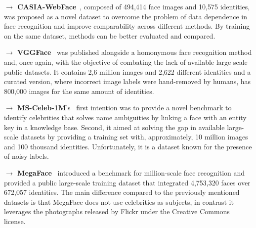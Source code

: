 \documentclass[class=report, crop=false, a4paper, 12pt]{standalone}
\begin{document}
\vspace{0.7\baselineskip}
\noindent\textbf{$\rightarrow$ CASIA-WebFace}~\autocite{yiLearningFaceRepresentation2014}, composed of 494,414 face images and 10,575 identities, was proposed as a novel dataset to overcome the problem of data dependence in face recognition and improve comparability across different methods. By training on the same dataset, methods can be better evaluated and compared.

\vspace{0.7\baselineskip}
\noindent\textbf{$\rightarrow$ VGGFace}~\autocite{parkhiDeepFaceRecognition2015} was published alongside a homonymous face recognition method and, once again, with the objective of combating the lack of available large scale public datasets. It contains 2,6 million images and 2,622 different identities and a curated version, where incorrect image labels were hand-removed by humans, has 800,000 images for the same amount of identities.




\vspace{0.7\baselineskip}
\noindent\textbf{$\rightarrow$ MS-Celeb-1M}'s~\autocite{guoMSCeleb1MDatasetBenchmark2016} first intention was to provide a novel benchmark to identify celebrities that solves name ambiguities by linking a face with an entity key in a knowledge base. Second, it aimed at solving the gap in available large-scale datasets by providing a training set with, approximately, 10 million images and 100 thousand identities. Unfortunately, it is a dataset known for the presence of noisy labels. 


\vspace{0.7\baselineskip}
\noindent\textbf{$\rightarrow$ MegaFace}~\autocite{nechLevelPlayingField2017} introduced a benchmark for million-scale face recognition and provided a public large-scale training dataset that integrated 4,753,320 faces over 672,057 identities. The main difference compared to the previously mentioned datasets is that MegaFace does not use celebrities as subjects, in contrast it leverages the photographs released by Flickr under the Creative Commons license. 
\end{document}
